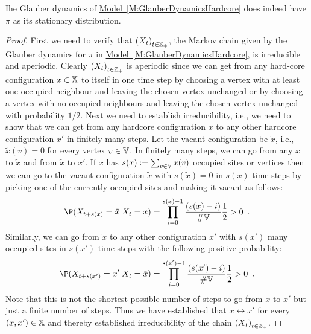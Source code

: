 \begin{prop}
Ihe Glauber dynamics of \hyperref[M:GlauberDynamicsHardcore]{Model~\ref*{M:GlauberDynamicsHardcore}} does indeed have $\pi$ as its stationary distribution.
\begin{proof}
First we need to verify that $\left( X_t \right)_{t \in \mathbb{Z}_+}$, the Markov chain given by the Glauber dynamics for $\pi$ in \hyperref[M:GlauberDynamicsHardcore]{Model~\ref*{M:GlauberDynamicsHardcore}}, is irreducible and aperiodic.  
Clearly $\left( X_t \right)_{t \in \mathbb{Z}_+}$ is aperiodic since we can get from any hard-core configuration $x \in \mathbb{X}$ to itself in one time step by choosing a vertex with at least one occupied neighbour and leaving the chosen vertex unchanged or by choosing a vertex with no occupied neighbours and leaving the chosen vertex unchanged with probability $1/2$.  
Next we need to establish irreducibility, i.e., we need to show that we can get from any hardcore configuration $x$ to any other hardcore configuration $x'$ in finitely many steps.  
Let the vacant configuration be $\tilde{x}$, i.e., $\tilde{x}(v)=0$ for every vertex $v \in \mathbb{V}$.  
In finitely many steps, we can go from any $x$ to $\tilde{x}$ and from $\tilde{x}$ to $x'$.  
If $x$ has $s(x):=\sum_{v \in \mathbb{V}}x(v)$ occupied sites or vertices then we can go to the vacant configuration $\tilde{x}$ with $s(\tilde{x})=0$ in $s(x)$ time steps by picking one of the currently occupied sites and making it vacant as follows:
\[
\P(X_{t+s(x)} = \tilde{x} | X_t = x) = \prod_{i=0}^{s(x)-1} \frac{(s(x)-i)}{\#\Vz}\frac{1}{2} > 0 \enspace .
\]
Similarly, we can go from $\tilde{x}$ to any other configuration $x'$ with $s(x')$ many occupied sites in $s(x')$ time steps with the following positive probability:
\[
\P(X_{t+s(x')} = x' | X_t = \tilde{x}) = \prod_{i=0}^{s(x')-1} \frac{(s(x')-i)}{\#\Vz}\frac{1}{2} > 0 \enspace .
\]
Note that this is not the shortest possible number of steps to go from $x$ to $x'$ but just a finite number of steps.  
Thus we have established that $x \leftrightarrow x'$ for every $(x,x') \in \mathbb{X}$ and thereby established irreducibility of the chain $\left( X_t \right)_{t \in \mathbb{Z}_+}$.  


\end{proof}
\end{prop}
